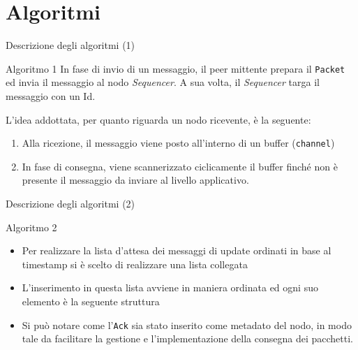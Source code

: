 \documentclass[
	usepdftitle=false,
	xcolor={table, dvipsnames},
	hyperref={
		pdftitle={Multicast totalmente e causalmente ordinato in Go},
    	pdfauthor={A. Chillotti}
    }
]{beamer}
\begin{document}
\section{Algoritmi}

\begin{frame}{Descrizione degli algoritmi (1)}

\begin{block}{Algoritmo 1}
In fase di invio di un messaggio, il peer mittente prepara il \texttt{Packet} ed invia il messaggio al nodo \textit{Sequencer}. A sua volta, il \textit{Sequencer} targa il messaggio con un Id.

L'idea addottata, per quanto riguarda un nodo ricevente, è la seguente:
\begin{enumerate}
\item Alla ricezione, il messaggio viene posto all'interno di un buffer (\texttt{channel})
\item In fase di consegna, viene scannerizzato ciclicamente il buffer finché non è presente il messaggio da inviare al livello applicativo.
\end{enumerate}
\end{block}

\end{frame}

\begin{frame}{Descrizione degli algoritmi (2)}

\begin{block}{Algoritmo 2}
\begin{itemize}
\item Per realizzare la lista d'attesa dei messaggi di update ordinati in base al timestamp si è scelto di realizzare una lista collegata
\item L'inserimento in questa lista avviene in maniera ordinata ed ogni suo elemento è la seguente struttura
\begin{figure}[ht]
\centering
{}
\end{figure}
\item Si può notare come l'\texttt{Ack} sia stato inserito come metadato del nodo, in modo tale da facilitare la gestione e l'implementazione della consegna dei pacchetti.
\end{itemize}
\end{block}

\end{frame}
\end{document}
